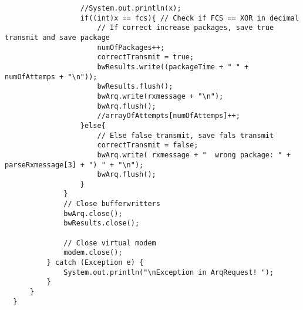 \documentclass[10pt,a4paper]{article}
\begin{document}
\begin{lstlisting}
                  //System.out.println(x);
                  if((int)x == fcs){ // Check if FCS == XOR in decimal
                      // If correct increase packages, save true transmit and save package
                      numOfPackages++;
                      correctTransmit = true;
                      bwResults.write((packageTime + " " + numOfAttemps + "\n"));
                      bwResults.flush();
                      bwArq.write(rxmessage + "\n");
                      bwArq.flush();
                      //arrayOfAttempts[numOfAttemps]++;
                  }else{
                      // Else false transmit, save fals transmit
                      correctTransmit = false;
                      bwArq.write( rxmessage + "  wrong package: " + parseRxmessage[3] + ") " + "\n");
                      bwArq.flush();
                  }
              }
              // Close bufferwritters
              bwArq.close();
              bwResults.close();
  
              // Close virtual modem
              modem.close();
          } catch (Exception e) {
              System.out.println("\nException in ArqRequest! ");
          }
      }
  }
\end{lstlisting}
\end{document}
